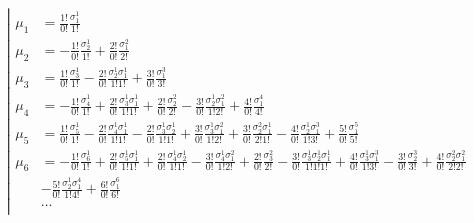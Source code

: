 \begin{equation*} \left| \begin{aligned}
\mu_1 &= 
  \frac{1!}{0!} \frac{\sigma_1^1}{1!}
\\
\mu_2 &= 
- \frac{1!}{0!} \frac{\sigma_2^1}{1!} 
+ \frac{2!}{0!} \frac{\sigma_1^2}{2!}
\\
\mu_3 &= 
  \frac{1!}{0!} \frac{\sigma_3^1}{1!} 
- \frac{2!}{0!} \frac{\sigma_2^1 \sigma_1^1}{1!1!} 
+ \frac{3!}{0!} \frac{\sigma_1^3}{3!}
\\
\mu_4 &= 
- \frac{1!}{0!} \frac{\sigma_4^1}{1!} 
+ \frac{2!}{0!} \frac{\sigma_3^1 \sigma_1^1}{1!1!} 
+ \frac{2!}{0!} \frac{\sigma_2^2}{2!}
- \frac{3!}{0!} \frac{\sigma_2^1 \sigma_1^2}{1!2!}
+ \frac{4!}{0!} \frac{\sigma_1^4}{4!}
\\
\mu_5 &=
  \frac{1!}{0!} \frac{\sigma_5^1}{1!} 
- \frac{2!}{0!} \frac{\sigma_4^1 \sigma_1^1}{1!1!} 
- \frac{2!}{0!} \frac{\sigma_3^1 \sigma_2^1}{1!1!}
+ \frac{3!}{0!} \frac{\sigma_3^1 \sigma_1^2}{1!2!}
+ \frac{3!}{0!} \frac{\sigma_2^2 \sigma_1^1}{2!1!}
- \frac{4!}{0!} \frac{\sigma_2^1 \sigma_1^3}{1!3!}
+ \frac{5!}{0!} \frac{\sigma_1^5}{5!}
\\
\mu_6 &=
- \frac{1!}{0!} \frac{\sigma_6^1}{1!} 
+ \frac{2!}{0!} \frac{\sigma_5^1 \sigma_1^1}{1!1!} 
+ \frac{2!}{0!} \frac{\sigma_4^1 \sigma_2^1}{1!1!}
- \frac{3!}{0!} \frac{\sigma_4^1 \sigma_1^2}{1!2!}
+ \frac{2!}{0!} \frac{\sigma_3^2}{2!}
- \frac{3!}{0!} \frac{\sigma_3^1 \sigma_2^1 \sigma_1^1}{1!1!1!}
+ \frac{4!}{0!} \frac{\sigma_3^1 \sigma_1^3}{1!3!}
- \frac{3!}{0!} \frac{\sigma_2^3}{3!}
+ \frac{4!}{0!} \frac{\sigma_2^2 \sigma_1^2}{2!2!} \\ &
- \frac{5!}{0!} \frac{\sigma_2^1 \sigma_1^4}{1!4!}
+ \frac{6!}{0!} \frac{\sigma_1^6}{6!}
\\
&\ldots
\\
\end{aligned} \right. \end{equation*}